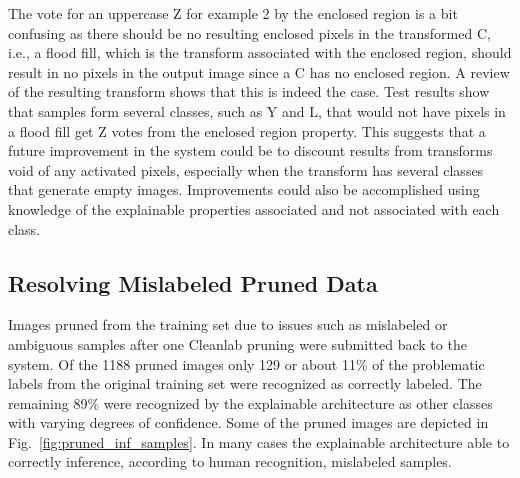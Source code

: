 \documentclass[conference]{IEEEtran}
\begin{document}
The vote for an uppercase Z for example 2 by the enclosed region is a bit
confusing as there should be no resulting enclosed pixels in the transformed C,
i.e., a flood fill, which is the transform associated with the enclosed region,
should result in no pixels in the output image since a C has no enclosed region.
A review of the resulting transform shows that this is indeed the case.  Test
results show that samples form several classes, such as Y and L, that would not
have pixels in a flood fill get Z votes from the enclosed region property.  This
suggests that a future improvement in the system could be to discount results
from transforms void of any activated pixels, especially when the transform has
several classes that generate empty images.  Improvements could also be
accomplished using knowledge of the explainable properties associated and not
associated with each class.



\subsection{Resolving Mislabeled Pruned Data}
\label{results:resolving}

Images pruned from the training set due to issues such as mislabeled or
ambiguous samples after one Cleanlab pruning were submitted back to the system.  
Of the 1188 pruned images only 129 or about 11\% of the problematic labels from
the original training set were recognized as correctly labeled.  The remaining
89\% were recognized by the explainable architecture as other classes with
varying degrees of confidence. Some of the pruned images are depicted in
Fig.~\ref{fig:pruned_inf_samples}.  In many cases the explainable architecture
able to correctly inference, according to human recognition, mislabeled samples.
\end{document}
